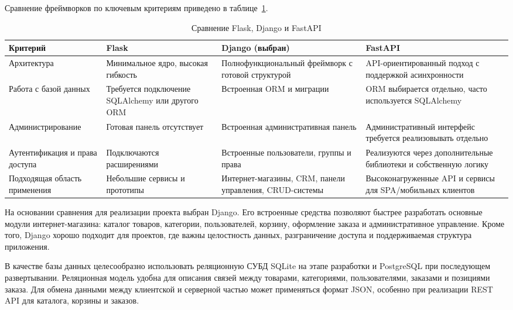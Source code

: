 Сравнение фреймворков по ключевым критериям приведено в таблице~\ref{tab:framework_compare}.

\begin{table}[H]
    \centering
    \caption{Сравнение Flask, Django и FastAPI}
    \label{tab:framework_compare}
    \small
    \begin{tabular}{|p{3cm}|p{3.6cm}|p{3.6cm}|p{3.6cm}|}
        \hline
        \textbf{Критерий} & \textbf{Flask} & \textbf{Django (выбран)} & \textbf{FastAPI} \\ \hline
        Архитектура & Минимальное ядро, высокая гибкость & Полнофункциональный фреймворк с готовой структурой & API-ориентированный подход с поддержкой асинхронности \\ \hline
        Работа с базой данных & Требуется подключение SQLAlchemy или другого ORM & Встроенная ORM и миграции & ORM выбирается отдельно, часто используется SQLAlchemy \\ \hline
        Администрирование & Готовая панель отсутствует & Встроенная административная панель & Административный интерфейс требуется реализовывать отдельно \\ \hline
        Аутентификация и права доступа & Подключаются расширениями & Встроенные пользователи, группы и права & Реализуются через дополнительные библиотеки и собственную логику \\ \hline
        Подходящая область применения & Небольшие сервисы и прототипы & Интернет-магазины, CRM, панели управления, CRUD-системы & Высоконагруженные API и сервисы для SPA/мобильных клиентов \\ \hline
    \end{tabular}
\end{table}

На основании сравнения для реализации проекта выбран Django. Его встроенные средства позволяют быстрее разработать основные модули интернет-магазина: каталог товаров, категории, пользователей, корзину, оформление заказа и административное управление. Кроме того, Django хорошо подходит для проектов, где важны целостность данных, разграничение доступа и поддерживаемая структура приложения.

В качестве базы данных целесообразно использовать реляционную СУБД SQLite на этапе разработки и PostgreSQL при последующем развертывании. Реляционная модель удобна для описания связей между товарами, категориями, пользователями, заказами и позициями заказа. Для обмена данными между клиентской и серверной частью может применяться формат JSON, особенно при реализации REST API для каталога, корзины и заказов.

